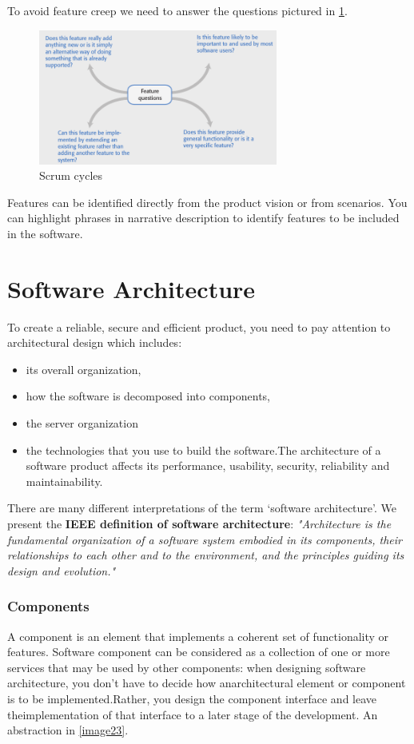 \documentclass[10pt,a4paper]{report}
\begin{document}
To avoid feature creep we need to answer the questions pictured in \ref{image22}.
\begin{figure}[h]
	\centering
	\includegraphics[width=0.7\textwidth]{image22}
	\caption{Scrum cycles}
	\label{image22}
\end{figure}

Features can be identified directly from the product vision or from
scenarios. You can highlight phrases in narrative description to identify features to be included in the software.

\chapter{Software Architecture}
To create a reliable, secure and efficient product, you need to pay attention to architectural design which includes:
\begin{itemize}
	\item its overall organization,
	\item how the software is decomposed into components,
	\item the server organization
	\item the technologies that you use to build the software.The architecture of a software
	product affects its performance, usability, security, reliability and maintainability.
	\end{itemize}
There are many different interpretations of the term ‘software architecture’. We present the \textbf{IEEE definition of software architecture}: \textit{"Architecture is the fundamental organization of a software system embodied in its components, their relationships to each other and to the environment, and the principles guiding its design and evolution."}

\subsection{Components}
A component is an element that implements a coherent set of functionality or features.
Software component can be considered as a collection of one or more services that may be used by other components: when designing software architecture, you don’t have to decide how anarchitectural element or component is to be implemented.Rather, you design the component interface and leave theimplementation of that interface to a later stage of the development. An abstraction in \ref{image23}.
\end{document}
